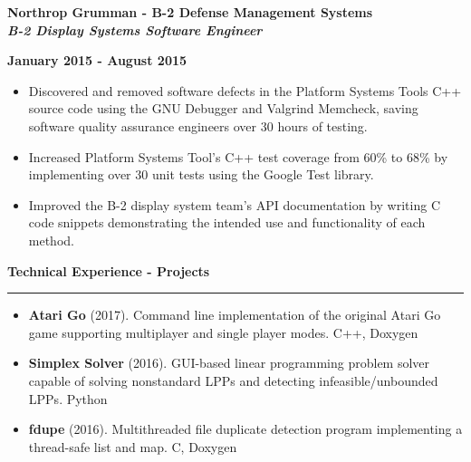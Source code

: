 \documentclass[10pt,letterpaper]{article}
\begin{document}
\medskip

\begin{minipage}[t]{0.53\textwidth}
        \begin{flushleft}
                \textbf{Northrop Grumman - B-2 Defense Management Systems}\\
                \textbf{\textit{B-2 Display Systems Software Engineer}}\\
        \end{flushleft}
\end{minipage}
\begin{minipage}[t]{0.44\textwidth}
        \begin{flushright}
                \textbf{January 2015 - August 2015}
        \end{flushright}
\end{minipage}

\begin{itemize}[noitemsep,topsep=0pt]
        \setlength\itemsep{-0.10em}
        \item Discovered and removed software defects in the
              Platform Systems Tools C++ source code using the GNU Debugger and Valgrind
              Memcheck, saving software quality assurance engineers over 30 hours of
              testing.
        \item Increased Platform Systems Tool's C++ test coverage from 60\% to 68\% by
              implementing over 30 unit tests using the Google Test library.
        \item Improved the B-2 display system team's API documentation by writing C code
              snippets demonstrating the intended use and functionality of each method.
\end{itemize}

\medskip

\begin{large}
        \textbf{Technical Experience - Projects}
\end{large}

\smallskip \hrule \smallskip

\begin{itemize}[topsep=0pt]
        \setlength\itemsep{-0.10em}
        \item \textbf{Atari Go} (2017). Command line implementation of the original Atari Go game supporting multiplayer and single player modes. C++, Doxygen
        \item \textbf{Simplex Solver} (2016). GUI-based linear programming problem solver capable of solving nonstandard LPPs and detecting infeasible/unbounded LPPs. Python
        \item \textbf{fdupe} (2016). Multithreaded file duplicate detection program implementing a thread-safe list and map. C, Doxygen
\end{itemize}
\end{document}
